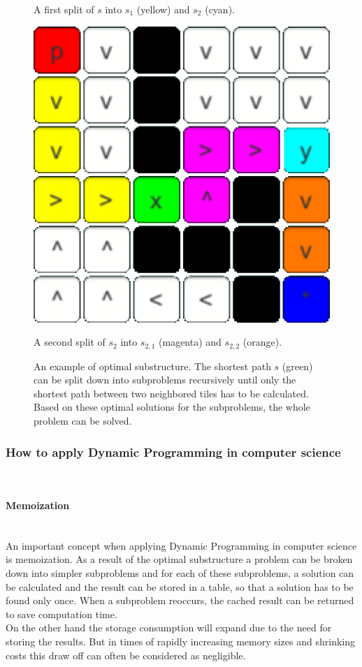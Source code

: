 \documentclass[conference]{IEEEtran}
\begin{document}
\begin{figure}[h]
\begin{minipage}[t]{0.3\linewidth}
\caption{A first split of $s$ into $s_1$ (yellow) and $s_2$ (cyan).}
\end{minipage}
\hfill
\begin{minipage}[t]{0.3\linewidth}
\centering
\includegraphics[width=1\textwidth]{images/OptimalSubstructure/second.png}
\caption{A second split of $s_2$ into $s_{2,1}$ (magenta) and $s_{2,2}$ (orange).}
\end{minipage}
\caption{An example of optimal substructure. The shortest path $s$ (green) can be split down into subproblems recursively until only the shortest path between two neighbored tiles has to be calculated. Based on these optimal solutions for the subproblems, the whole problem can be solved.}
\end{figure}

\subsubsection{How to apply Dynamic Programming in computer science}
\quad \\
\paragraph{Memoization}
\quad \\
An important concept when applying Dynamic Programming in computer science is memoization. As a result of the optimal substructure a problem can be broken down into simpler subproblems and for each of these subproblems, a solution can be calculated and the result can be stored in a table, so that a solution has to be found only once. When a subproblem reoccurs, the cached result can be returned to save computation time. \cite{Cormen.2009}
\\
On the other hand the storage consumption will expand due to the need for storing the results. But in times of rapidly increasing memory sizes and shrinking costs this draw off can often be considered as negligible. \cite{Cormen.2009}
\\
\end{document}
